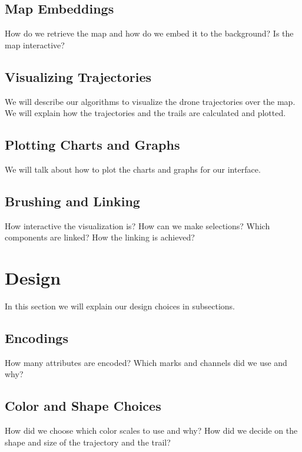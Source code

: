 \documentclass[journal]{vgtc}                %
\begin{document}
	\subsection{Map Embeddings}
	
	How do we retrieve the map and how do we embed it to the background? Is the map interactive?
	
	\subsection{Visualizing Trajectories}
	
	We will describe our algorithms to visualize the drone trajectories over the map. We will explain how the trajectories and the trails are calculated and plotted.
	
	\subsection{Plotting Charts and Graphs}
	
	We will talk about how to plot the charts and graphs for our interface.
	
	\subsection{Brushing and Linking}
	
	How interactive the visualization is? How can we make selections? Which components are linked? How the linking is achieved?

\section{Design}

In this section we will explain our design choices in subsections.

	\subsection{Encodings}
	
	How many attributes are encoded? Which marks and channels did we use and why?
	
	\subsection{Color and Shape Choices}
	
	How did we choose which color scales to use and why? How did we decide on the shape and size of the trajectory and the trail?
	
\end{document}
